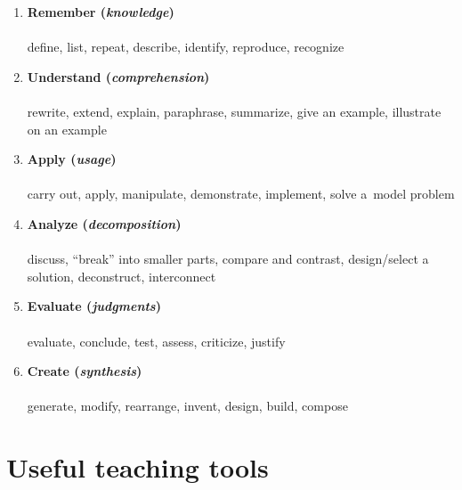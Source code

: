 \begin{enumerate}[leftmargin=*]
\item \textbf{Remember (\textit{knowledge})}\\
\\
{\small define, list, repeat, describe, identify, reproduce, recognize}

\item \textbf{Understand (\textit{comprehension})}\\
\\
{\small rewrite, extend, explain, paraphrase, summarize, give an example, illustrate on an example}

\item \textbf{Apply (\textit{usage})}\\
\\
{\small carry out, apply, manipulate, demonstrate, implement, solve a~model problem}

\item \textbf{Analyze (\textit{decomposition})}\\
\\
{\small discuss, \enquote{break} into smaller parts, compare and contrast, design/select a solution, deconstruct, interconnect}

\item \textbf{Evaluate (\textit{judgments})}\\
\\
{\small evaluate, conclude, test, assess, criticize, justify}

\item \textbf{Create (\textit{synthesis})}\\
\\
{\small generate, modify, rearrange, invent, design, build, compose}
\end{enumerate}


\chapter*{Useful teaching tools}
\vspace{-0.5em}

